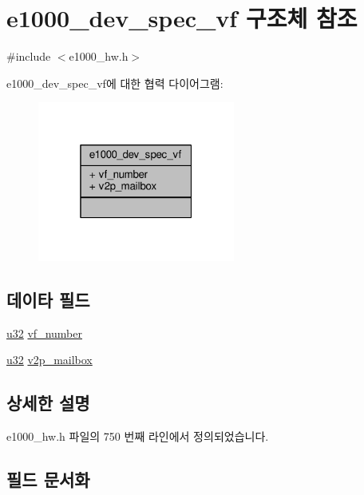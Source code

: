 \hypertarget{structe1000__dev__spec__vf}{}\section{e1000\+\_\+dev\+\_\+spec\+\_\+vf 구조체 참조}
\label{structe1000__dev__spec__vf}


{\ttfamily \#include $<$e1000\+\_\+hw.\+h$>$}



e1000\+\_\+dev\+\_\+spec\+\_\+vf에 대한 협력 다이어그램\+:
\nopagebreak
\begin{figure}[H]
\begin{center}
\leavevmode
\includegraphics[width=184pt]{structe1000__dev__spec__vf__coll__graph}
\end{center}
\end{figure}
\subsection*{데이타 필드}
\begin{DoxyCompactItemize}
\item 
\hyperlink{lib_2igb_2e1000__osdep_8h_a64e91c10a0d8fb627e92932050284264}{u32} \hyperlink{structe1000__dev__spec__vf_a1b427874ff64ff83cebe67db32af1b2d}{vf\+\_\+number}
\item 
\hyperlink{lib_2igb_2e1000__osdep_8h_a64e91c10a0d8fb627e92932050284264}{u32} \hyperlink{structe1000__dev__spec__vf_a89b413c76c22275baa958b21f0fbc8b2}{v2p\+\_\+mailbox}
\end{DoxyCompactItemize}


\subsection{상세한 설명}


e1000\+\_\+hw.\+h 파일의 750 번째 라인에서 정의되었습니다.



\subsection{필드 문서화}

